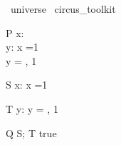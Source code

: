 \begin{zsection}
  \SECTION\ universe \parents\ circus\_toolkit
\end{zsection}


 
 \begin{schema}{P}
     x:  \universe \\ 
     y:  \universe
 \where
     x =1 \\
     y = , 1 \rangle
 \end{schema} 
 
 \begin{schema}{S}
     x:  \universe 
 \where
     x =1
 \end{schema}
 
 \begin{schema}{T}
    y:  \universe
\where
    y = , 1 \rangle
\end{schema}

\begin{schema}{Q}
      S; T
 \where
     true 
\end{schema}
